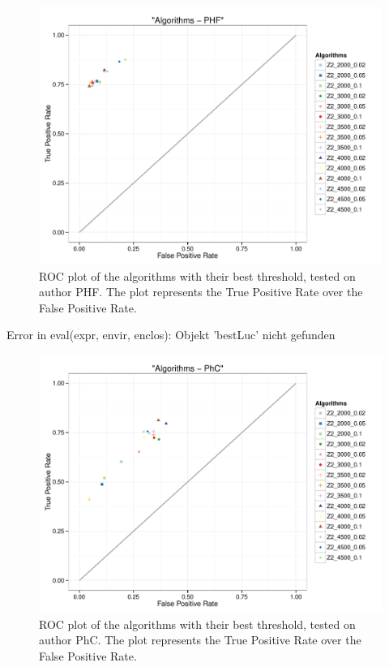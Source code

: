 \documentclass{article}\usepackage[]{graphicx}\usepackage[]{color}
\begin{document}
\begin{Schunk}
\begin{figure}
\includegraphics[width=\textwidth]{figures/theme-bestPHFplot-1} \caption[ROC plot of the algorithms with their best threshold, tested on author PHF]{ROC plot of the algorithms with their best threshold, tested on author PHF. The plot represents the True Positive Rate over the False Positive Rate.}\label{fig:bestPHFplot}
\end{figure}
\end{Schunk}
\begin{Schunk}
\begin{Soutput}
Error in eval(expr, envir, enclos): Objekt 'bestLuc' nicht gefunden
\end{Soutput}
\end{Schunk}
\begin{Schunk}
\begin{figure}
\includegraphics[width=\textwidth]{figures/theme-bestPhCplot-1} \caption[ROC plot of the algorithms with their best threshold, tested on author PhC]{ROC plot of the algorithms with their best threshold, tested on author PhC. The plot represents the True Positive Rate over the False Positive Rate.}\label{fig:bestPhCplot}
\end{figure}
\end{Schunk}
\end{document}
